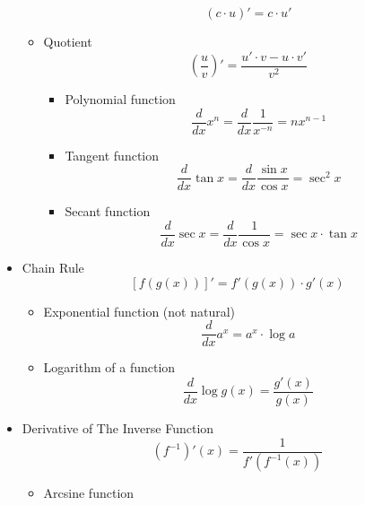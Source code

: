 \begin{itemize}
\begin{itemize}
					\begin{equation}
						(c \cdot u)' = c \cdot u'
					\end{equation}
				\item Quotient
					\begin{equation}
						\left( \frac{u}{v} \right) ' = \frac{u' \cdot v - u \cdot v'}{v^2}
					\end{equation}
					\begin{itemize}
						\item Polynomial function
							\begin{equation}
								\dfrac{d}{dx} x^n = \dfrac{d}{dx} \frac{1}{x^{-n}} = n x^{n-1}
							\end{equation}
						\item Tangent function
							\begin{equation}
								\dfrac{d}{dx} \tan x = \dfrac{d}{dx} \frac{\sin x}{\cos x} = \sec^2 x
							\end{equation}
						\item Secant function
							\begin{equation}
								\dfrac{d}{dx} \sec x = \dfrac{d}{dx} \frac{1}{\cos x} = \sec x \cdot \tan x
							\end{equation}
					\end{itemize}
			\end{itemize}
		\item Chain Rule
			\begin{equation}
				\left[ f(g(x)) \right]' = f'(g(x)) \cdot g'(x)
			\end{equation}
			\begin{itemize}
				\item Exponential function (not natural)
					\begin{equation}
						\dfrac{d}{dx} a^x = a^x \cdot \log a
					\end{equation}
				\item Logarithm of a function
					\begin{equation}
						\dfrac{d}{dx} \log g(x) = \frac{g'(x)}{g(x)}
					\end{equation}
			\end{itemize}
		\item Derivative of The Inverse Function
			\begin{equation}
				\left( f^{-1} \right)' (x) = \frac{1}{f' \left( f^{-1} (x) \right)}
			\end{equation}
			\begin{itemize}
				\item Arcsine function

\end{itemize}
\end{itemize}
